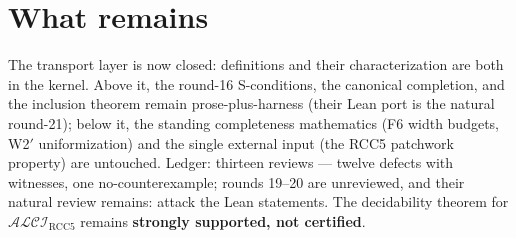 \documentclass[11pt]{article}
\newcommand{\ALCIRCC}{\mathcal{ALCI}_{\mathrm{RCC5}}}
\begin{document}
\section{What remains}

The transport layer is now closed: definitions and their
characterization are both in the kernel.  Above it, the round-16
S-conditions, the canonical completion, and the inclusion theorem
remain prose-plus-harness (their Lean port is the natural round-21);
below it, the standing completeness mathematics (F6 width budgets,
W2$'$ uniformization) and the single external input (the RCC5
patchwork property) are untouched.  Ledger: thirteen reviews ---
twelve defects with witnesses, one no-counterexample; rounds 19--20
are unreviewed, and their natural review remains: attack the Lean
statements.  The decidability theorem for $\ALCIRCC$ remains
\textbf{strongly supported, not certified}.
\end{document}
